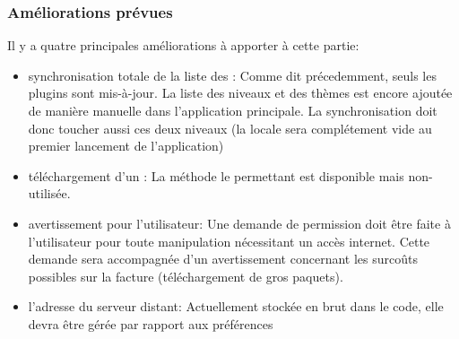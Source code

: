 \subsubsection{Améliorations prévues}
Il y a quatre principales améliorations à apporter à cette partie:
\begin{itemize}
    \item synchronisation totale de la liste des \plugin{}:
    \newline Comme dit précedemment, seuls les plugins sont mis-à-jour. La liste des niveaux et des thèmes est encore ajoutée de manière manuelle dans l’application principale. La synchronisation doit donc toucher aussi ces deux niveaux (la \bdd{} locale sera complétement vide au premier lancement de l'application)
    \item téléchargement d'un \plugin{}:
    \newline La méthode le permettant est disponible mais non-utilisée.
    \item avertissement pour l'utilisateur:
    \newline Une demande de permission doit être faite à l'utilisateur pour toute manipulation nécessitant un accès internet. Cette demande sera accompagnée d'un avertissement concernant les surcoûts possibles sur la facture (téléchargement de \og{}gros\fg{} paquets).
    \item l'adresse du serveur distant:
    \newline Actuellement stockée en brut dans le code, elle devra être gérée par rapport aux préférences
\end{itemize}

